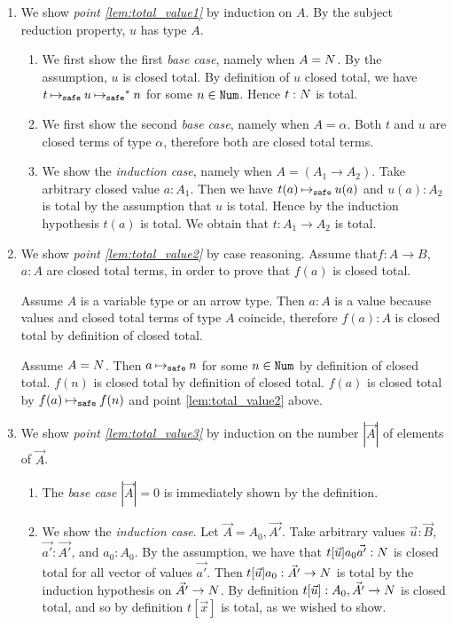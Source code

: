 \documentclass{article}
\newenvironment{proof}[1][Proof]{\begin{trivlist}
\item[\hskip \labelsep {\bfseries #1}]}{\end{trivlist}}
\begin{document}
\begin{proof}
\begin{enumerate}

\item
  We show \emph{point \ref{lem:total_value1}}  by induction on $A$. 
By the subject reduction property, $u$ has type $A$.
\begin{enumerate}
\item
  We first show the first \emph{base case}, namely when $A ={N}$.
  By the assumption, $u$ is closed total.
  By definition of $u$ closed total, we have $t \mathbin{{\mapsto}_{\tiny \tt safe}} u \mathbin{{\mapsto}_{\tiny \tt safe}}^* n$ for some $n\in{\tt Num}$. 
  Hence $t:{N}$ is total.
\item
  We first show the second \emph{base case}, namely when $A =\alpha$.
  Both $t$ and $u$ are closed terms of type $\alpha$, therefore both are closed total terms.
\item
  We show the \emph{induction case}, namely when $A = (A_1\rightarrow A_2)$.
  Take arbitrary closed value $a:A_1$. Then we have $t(a) \mathbin{{\mapsto}_{\tiny \tt safe}} u(a)$ and 
  $u(a):A_2$ is total by the assumption that $u$ is total.
  Hence by the induction hypothesis $t(a)$ is total. 
  We obtain that $t:A_1\rightarrow A_2$ is total. 
\end{enumerate}

  \item
We show \emph{point \ref{lem:total_value2}} by case reasoning.
Assume that$f:A \rightarrow B$, $a:A$ are closed total terms, in order to prove
that $f(a)$  is closed total.

Assume $A$ is a variable type or an arrow type. 
Then $a:A$ is a value because values and closed total terms of type $A$
coincide, therefore $f(a):A$ is closed total by definition of closed total.

Assume $A={N}$. Then $a \mathbin{{\mapsto}_{\tiny \tt safe}} n$ for some $n \in {\tt Num}$ by definition of closed total.
$f(n)$ is closed total by definition of closed total. $f(a)$ is closed total by $f(a) \mathbin{{\mapsto}_{\tiny \tt safe}} f(n)$
and point \ref{lem:total_value2} above.

\item  
  We show \emph{point \ref{lem:total_value3}} by induction on the number $|\vec{A}|$ of
elements of $\vec{A}$.
\begin{enumerate}
\item
  The \emph{base case} $|\vec{A}| = 0$ is immediately shown by the definition.
\item
  We show the \emph{induction case}. Let $\vec{A} = A_0,\vec{A'}$.
  Take arbitrary values $\vec{u}:\vec{B}$, $\vec{a'}:\vec{A'}$, and $a_0:A_0$. 
  By the assumption, we have that $t[\vec{u}]a_0\vec{a'}:{N}$ is closed total for all 
  vector of values $\vec{a'}$. 
  Then $t[\vec{u}]a_0:\vec{A'}\rightarrow{N}$ is total 
  by the induction hypothesis on $\vec{A'}\rightarrow {N}$.
  By definition $t[\vec{u}] : A_0,\vec{A'}\rightarrow{N}$ is closed total,
  and so by definition $t[\vec{x}]$ is total, as we wished to show.
\end{enumerate}

\end{enumerate}
\end{proof}
\end{document}
